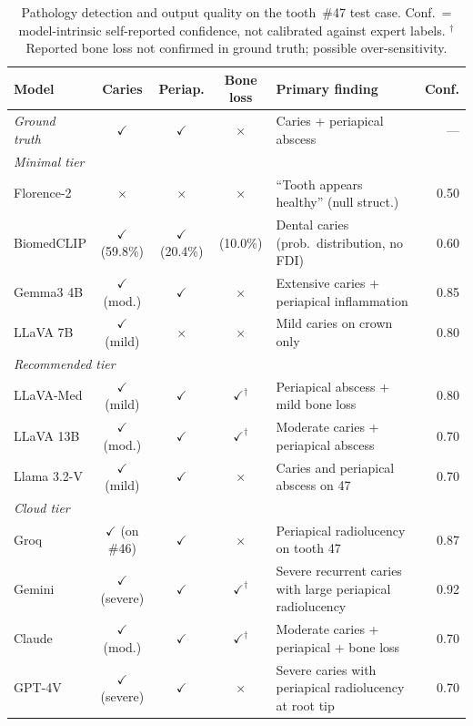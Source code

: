 \documentclass[12pt,a4paper]{report}
\begin{document}
	\begin{table}[H]
		\centering
		\caption{Pathology detection and output quality on the tooth~\#47 test case.
			Conf.\ = model-intrinsic self-reported confidence, not calibrated against expert labels.
			${}^{\dagger}$Reported bone loss not confirmed in ground truth; possible over-sensitivity.}
		\label{tab:pathology_detection}
		\small
		\renewcommand{\arraystretch}{1.2}
		\begin{tabularx}{\textwidth}{@{}l c c c X r@{}}
			\toprule
			\textbf{Model} & \textbf{Caries} & \textbf{Periap.} & \textbf{Bone loss} & \textbf{Primary finding} & \textbf{Conf.} \\
			\midrule
			\textit{Ground truth} & $\checkmark$ & $\checkmark$ & $\times$ & Caries + periapical abscess & --- \\
			\midrule
			\multicolumn{6}{l}{\textit{Minimal tier}} \\
			Florence-2  & $\times$ & $\times$ & $\times$ & ``Tooth appears healthy'' (null struct.) & 0.50 \\
			BiomedCLIP  & $\checkmark$ (59.8\%) & $\checkmark$ (20.4\%) & (10.0\%) & Dental caries (prob.\ distribution, no FDI) & 0.60 \\
			Gemma3 4B   & $\checkmark$ (mod.) & $\checkmark$ & $\times$ & Extensive caries + periapical inflammation & 0.85 \\
			LLaVA 7B    & $\checkmark$ (mild) & $\times$ & $\times$ & Mild caries on crown only & 0.80 \\
			\midrule
			\multicolumn{6}{l}{\textit{Recommended tier}} \\
			LLaVA-Med   & $\checkmark$ (mild) & $\checkmark$ & $\checkmark^{\dagger}$ & Periapical abscess + mild bone loss & 0.80 \\
			LLaVA 13B   & $\checkmark$ (mod.) & $\checkmark$ & $\checkmark^{\dagger}$ & Moderate caries + periapical abscess & 0.70 \\
			Llama 3.2-V & $\checkmark$ (mild) & $\checkmark$ & $\times$ & Caries and periapical abscess on 47 & 0.70 \\
			\midrule
			\multicolumn{6}{l}{\textit{Cloud tier}} \\
			Groq        & $\checkmark$ (on \#46) & $\checkmark$ & $\times$ & Periapical radiolucency on tooth 47 & 0.87 \\
			Gemini      & $\checkmark$ (severe) & $\checkmark$ & $\checkmark^{\dagger}$ & Severe recurrent caries with large periapical radiolucency & 0.92 \\
			Claude      & $\checkmark$ (mod.) & $\checkmark$ & $\checkmark^{\dagger}$ & Moderate caries + periapical + bone loss & 0.70 \\
			GPT-4V      & $\checkmark$ (severe) & $\checkmark$ & $\times$ & Severe caries with periapical radiolucency at root tip & 0.70 \\
			\bottomrule
		\end{tabularx}
	\end{table}
	
\end{document}
